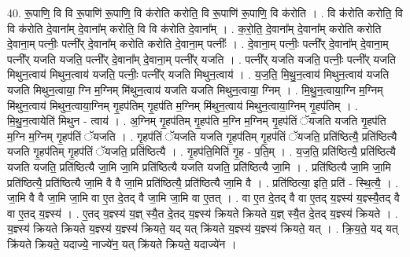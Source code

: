 \documentclass[17pt]{extarticle}
\begin{document}
40. रू॒पाणि॒ वि वि रू॒पाणि॑ रू॒पाणि॒ वि क॑रोति करोति॒ वि रू॒पाणि॑ रू॒पाणि॒ वि क॑रोति । . वि क॑रोति करोति॒ वि वि क॑रोति दे॒वाना᳚म् दे॒वाना᳚म् करोति॒ वि वि क॑रोति दे॒वाना᳚म् । . क॒रो॒ति॒ दे॒वाना᳚म् दे॒वाना᳚म् करोति करोति दे॒वाना॒म् पत्नीः॒ पत्नी᳚र् दे॒वाना᳚म् करोति करोति दे॒वाना॒म् पत्नीः᳚ । . दे॒वाना॒म् पत्नीः॒ पत्नी᳚र् दे॒वाना᳚म् दे॒वाना॒म् पत्नी᳚र् यजति यजति॒ पत्नी᳚र् दे॒वाना᳚म् दे॒वाना॒म् पत्नी᳚र् यजति । . पत्नी᳚र् यजति यजति॒ पत्नीः॒ पत्नी᳚र् यजति मिथुन॒त्वाय॑ मिथुन॒त्वाय॑ यजति॒ पत्नीः॒ पत्नी᳚र् यजति मिथुन॒त्वाय॑ । . य॒ज॒ति॒ मि॒थु॒न॒त्वाय॑ मिथुन॒त्वाय॑ यजति यजति मिथुन॒त्वाया॒ ग्नि म॒ग्निम् मि॑थुन॒त्वाय॑ यजति यजति मिथुन॒त्वाया॒ ग्निम् । . मि॒थु॒न॒त्वाया॒ग्नि म॒ग्निम् मि॑थुन॒त्वाय॑ मिथुन॒त्वाया॒ग्निम् गृ॒हप॑तिम् गृ॒हप॑ति म॒ग्निम् मि॑थुन॒त्वाय॑ मिथुन॒त्वाया॒ग्निम् गृ॒हप॑तिम् । . मि॒थु॒न॒त्वायेति॑ मिथुन - त्वाय॑ । . अ॒ग्निम् गृ॒हप॑तिम् गृ॒हप॑ति म॒ग्नि म॒ग्निम् गृ॒हप॑तिं ॅयजति यजति गृ॒हप॑ति म॒ग्नि म॒ग्निम् गृ॒हप॑तिं ॅयजति । . गृ॒हप॑तिं ॅयजति यजति गृ॒हप॑तिम् गृ॒हप॑तिं ॅयजति॒ प्रति॑ष्ठित्यै॒ प्रति॑ष्ठित्यै यजति गृ॒हप॑तिम् गृ॒हप॑तिं ॅयजति॒ प्रति॑ष्ठित्यै । . गृ॒हप॑ति॒मिति॑ गृ॒ह - प॒ति॒म् । . य॒ज॒ति॒ प्रति॑ष्ठित्यै॒ प्रति॑ष्ठित्यै यजति यजति॒ प्रति॑ष्ठित्यै जा॒मि जा॒मि प्रति॑ष्ठित्यै यजति यजति॒ प्रति॑ष्ठित्यै जा॒मि । . प्रति॑ष्ठित्यै जा॒मि जा॒मि प्रति॑ष्ठित्यै॒ प्रति॑ष्ठित्यै जा॒मि वै वै जा॒मि प्रति॑ष्ठित्यै॒ प्रति॑ष्ठित्यै जा॒मि वै । . प्रति॑ष्ठित्या॒ इति॒ प्रति॑ - स्थि॒त्यै॒ । . जा॒मि वै वै जा॒मि जा॒मि वा ए॒त दे॒तद् वै जा॒मि जा॒मि वा ए॒तत् । . वा ए॒त दे॒तद् वै वा ए॒तद् य॒ज्ञ्स्य॑ य॒ज्ञ्स्यै॒तद् वै वा ए॒तद् य॒ज्ञ्स्य॑ । . ए॒तद् य॒ज्ञ्स्य॑ य॒ज्ञ् स्यै॒त दे॒तद् य॒ज्ञ्स्य॑ क्रियते क्रियते य॒ज्ञ् स्यै॒त दे॒तद् य॒ज्ञ्स्य॑ क्रियते । . य॒ज्ञ्स्य॑ क्रियते क्रियते य॒ज्ञ्स्य॑ य॒ज्ञ्स्य॑ क्रियते॒ यद् यत् क्रि॑यते य॒ज्ञ्स्य॑ य॒ज्ञ्स्य॑ क्रियते॒ यत् । . क्रि॒य॒ते॒ यद् यत् क्रि॑यते क्रियते॒ यदाज्ये॒ नाज्ये॑न॒ यत् क्रि॑यते क्रियते॒ यदाज्ये॑न । \newline
\pagebreak
{}
\end{document}
